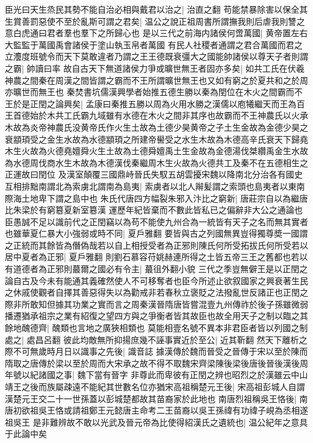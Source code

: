 臣光曰天生烝民其勢不能自治必相與戴君以治之|{
	治直之翻}
苟能禁暴除害以保全其生賞善罰惡使不至於亂斯可謂之君矣|{
	温公之說正祖周書所謂撫我則后虐我則讐之意白虎通曰君者羣也羣下之所歸心也}
是以三代之前海内諸侯何啻萬國|{
	黄帝置左右大監監于萬國禹會諸侯于塗山執玉帛者萬國}
有民人社稷者通謂之君合萬國而君之立灋度班號令而天下莫敢違者乃謂之王王德既衰彊大之國能帥諸侯以尊天子者則謂之霸|{
	帥讀曰率}
故自古天下無道諸侯力爭或曠世無王者固亦多矣|{
	如共工氏在伏羲神農之間秦在周漢之間皆謂之霸而不王所謂曠世無王也又如有窮之於夏共和之於周亦曠世而無王也}
秦焚書坑儒漢興學者始推五德生勝以秦為閏位在木火之間霸而不王於是正閏之論興矣|{
	孟康曰秦推五勝以周為火用水勝之漢儒以庖犧繼天而王為百王首德始於木共工氏霸九域雖有水德在木火之間非其序也故霸而不王神農氏以火承木故為炎帝神農氏没黄帝氏作火生土故為土德少昊黄帝之子土生金故為金德少昊之衰顓頊受之金生水故為水德顓頊之所建帝嚳受之水生木故為木德高辛氏衰天下歸堯木生火故為火德堯嬗舜火生土故為土德舜嬗禹土生金故為金德湯伐桀纘禹金生水故為水德周伐商水生木故為木德漢伐秦繼周木生火故為火德共工及秦不在五德相生之正運故曰閏位}
及漢室顛覆三國鼎峙晉氏失馭五胡雲擾宋魏以降南北分治各有國史互相排黜南謂北為索虜北謂南為島夷|{
	索虜者以北人辮髪謂之索頭也島夷者以東南際海土地卑下謂之島中也}
朱氏代唐四方幅裂朱邪入汴比之窮新|{
	唐莊宗自以為繼唐比朱梁於有窮簒夏新室簒漢}
運歷年紀皆棄而不數此皆私已之偏辭非大公之通論也臣愚誠不足以識前代之正閏竊以為苟不能使九州合為一統皆有天子之名而無其實者也雖華夏仁暴大小強弱或時不同|{
	夏戶雅翻}
要皆與古之列國無異豈得獨尊奬一國謂之正統而其餘皆為僭偽哉若以自上相授受者為正邪則陳氏何所受拓拔氏何所受若以居中夏者為正邪|{
	夏戶雅翻}
則劉石慕容苻姚赫連所得之土皆五帝三王之舊都也若以有道德者為正邪則蕞爾之國必有令主|{
	蕞徂外翻小貌}
三代之季豈無僻王是以正閏之論自古及今未有能通其義確然使人不可移奪者也臣今所述止欲叙國家之興衰著生民之休戚使觀者自擇其善惡得失以為勸戒非若春秋立褒貶之法撥亂世反諸正也正閏之際非所敢知但據其功業之實而言之周秦漢晉隋唐皆嘗混壹九州傳祚於後子孫雖微弱播遷猶承祖宗之業有紹復之望四方與之爭衡者皆其故臣也故全用天子之制以臨之其餘地醜德齊|{
	醜類也言地之廣狹相類也}
莫能相壹名號不異本非君臣者皆以列國之制處之|{
	處昌呂翻}
彼此均敵無所抑揚庶幾不誣事實近於至公|{
	近其靳翻}
然天下離析之際不可無歲時月日以識事之先後|{
	識音誌}
據漢傳於魏而晉受之晉傳于宋以至於陳而隋取之唐傳於梁以至於周而大宋承之故不得不取魏宋齊梁陳後梁後唐後晉後漢後周年號以紀諸國之事|{
	魏下當有晉字}
非尊此而卑彼有正閏之辨也昭烈之於漢雖云中山靖王之後而族屬疎遠不能紀其世數名位亦猶宋高祖稱楚元王後|{
	宋高祖彭城人自謂漢楚元王交二十一世孫蓋以彭城楚都故其苗裔家於此地也}
南唐烈祖稱吳王恪後|{
	南唐初欲祖吳王恪或請祖鄭王元懿唐主命考二王苗裔以吳王孫禕有功禕子峴為丞相遂祖吳王}
是非難辨故不敢以光武及晉元帝為比使得紹漢氏之遺統也|{
	温公紀年之意具于此論中矣}


